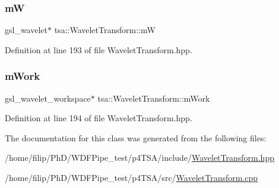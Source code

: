 \subsubsection{\texorpdfstring{mW}{mW}}
{\footnotesize\ttfamily gsl\+\_\+wavelet$\ast$ tsa\+::\+Wavelet\+Transform\+::mW\hspace{0.3cm}{\ttfamily [private]}}



Definition at line 193 of file Wavelet\+Transform.\+hpp.

\mbox{\label{classtsa_1_1_wavelet_transform_a0629db488589d2b7451746747456cee2}} 
\subsubsection{\texorpdfstring{m\+Work}{mWork}}
{\footnotesize\ttfamily gsl\+\_\+wavelet\+\_\+workspace$\ast$ tsa\+::\+Wavelet\+Transform\+::m\+Work\hspace{0.3cm}{\ttfamily [private]}}



Definition at line 194 of file Wavelet\+Transform.\+hpp.



The documentation for this class was generated from the following files\+:\begin{DoxyCompactItemize}
\item 
/home/filip/\+Ph\+D/\+W\+D\+F\+Pipe\+\_\+test/p4\+T\+S\+A/include/\hyperlink{_wavelet_transform_8hpp}{Wavelet\+Transform.\+hpp}\item 
/home/filip/\+Ph\+D/\+W\+D\+F\+Pipe\+\_\+test/p4\+T\+S\+A/src/\hyperlink{_wavelet_transform_8cpp}{Wavelet\+Transform.\+cpp}\end{DoxyCompactItemize}
